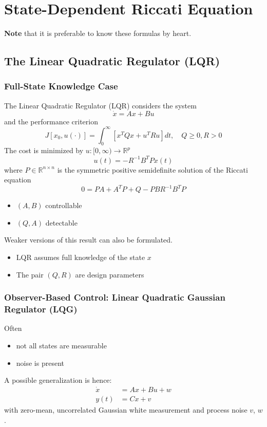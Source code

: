 \section{State-Dependent Riccati Equation}
\textbf{Note} that it is preferable to know these formulas by heart.
\subsection{The Linear Quadratic Regulator (LQR)}
\subsubsection{Full-State Knowledge Case}
The Linear Quadratic Regulator (LQR) considers the system
\begin{equation*}
    \dot{x} = A x + B u
\end{equation*}
and the performance criterion
\begin{equation*}
    J[x_0, u(\cdot)] = \int_0^{\infty} \left[ x^T Q x + u^T R u \right] dt, \quad Q \geq 0, R > 0
\end{equation*}
\newpar{}
The cost is minimized by $u : [0,\infty) \rightarrow \mathbb{R}^p$     %
\begin{equation*}
    u(t) = -R^{-1} B^T P x(t)
\end{equation*}
where $P \in \mathbb{R}^{n \times n}$ is the symmetric positive semidefinite solution of the Riccati equation
\begin{equation*}
    0 = P A + A^T P + Q - P B R^{-1} B^T P
\end{equation*}

\newpar{}

\begin{itemize}
    \item $(A, B)$ controllable
    \item $(Q, A)$ detectable
\end{itemize}
Weaker versions of this result can also be formulated.

\newpar{}

\begin{itemize}
    \item LQR assumes full knowledge of the state $x$
    \item The pair $(Q, R)$ are design parameters
\end{itemize}

\subsubsection{Observer-Based Control: Linear Quadratic Gaussian Regulator (LQG)}
Often
\begin{itemize}
    \item not all states are measurable
    \item noise is present
\end{itemize}
\newpar{}
A possible generalization is hence:
\begin{align*}
    \dot{x} & = A x + B u + w \\
    y(t)    & = C x + v
\end{align*}
with zero-mean, uncorrelated Gaussian white measurement and process noise $v$, $w$.


